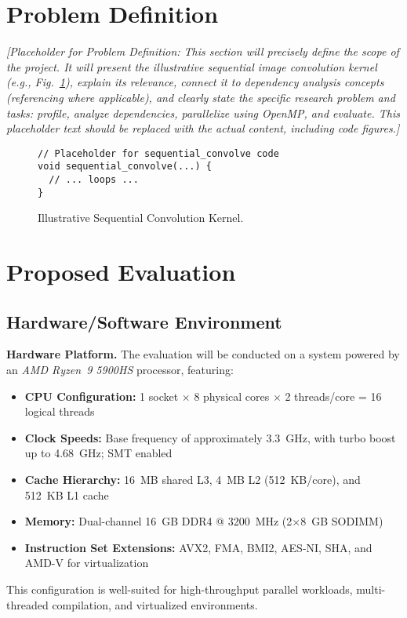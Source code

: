 \documentclass[conference, 10pt]{IEEEtran}
\begin{document}
\section{Problem Definition}
\textit{{\color{blue} %
[Placeholder for Problem Definition: This section will precisely define the scope of the project. It will present the illustrative sequential image convolution kernel (e.g., Fig.~\ref{fig:seq_code}), explain its relevance, connect it to dependency analysis concepts (referencing where applicable), and clearly state the specific research problem and tasks: profile, analyze dependencies, parallelize using OpenMP, and evaluate. This placeholder text should be replaced with the actual content, including code figures.]
}}

\begin{figure}[htbp]
\begin{verbatim}
// Placeholder for sequential_convolve code
void sequential_convolve(...) {
  // ... loops ...
}
\end{verbatim}
\caption{Illustrative Sequential Convolution Kernel.}
\label{fig:seq_code}
\end{figure}


\section{Proposed Evaluation}

\subsection{Hardware/Software Environment}

\textbf{Hardware Platform.} The evaluation will be conducted on a system powered by an \textit{AMD Ryzen\texttrademark~9 5900HS} processor, featuring:
\begin{itemize}
    \item \textbf{CPU Configuration:} 1 socket $\times$ 8 physical cores $\times$ 2 threads/core = 16 logical threads
    \item \textbf{Clock Speeds:} Base frequency of approximately 3.3~GHz, with turbo boost up to 4.68~GHz; SMT enabled
    \item \textbf{Cache Hierarchy:} 16~MB shared L3, 4~MB L2 (512~KB/core), and 512~KB L1 cache
    \item \textbf{Memory:} Dual-channel 16~GB DDR4 @ 3200~MHz (2$\times$8~GB SODIMM)
    \item \textbf{Instruction Set Extensions:} AVX2, FMA, BMI2, AES-NI, SHA, and AMD-V for virtualization
\end{itemize}
This configuration is well-suited for high-throughput parallel workloads, multi-threaded compilation, and virtualized environments.
\end{document}
